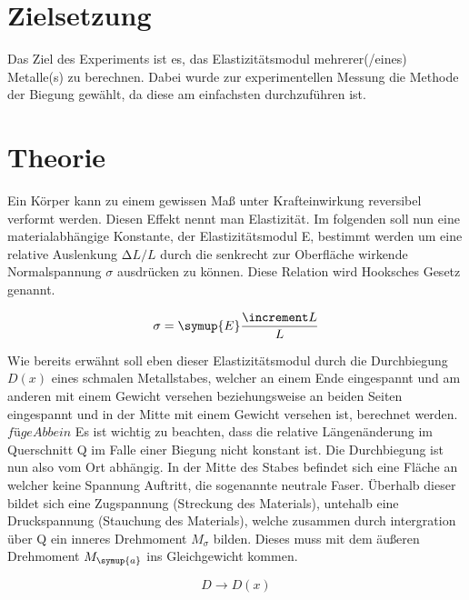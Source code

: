 \section{Zielsetzung}
\label{sec:Zielsetzung}

Das Ziel des Experiments ist es, das Elastizitätsmodul mehrerer(/eines) Metalle(s) zu berechnen.
Dabei wurde zur experimentellen Messung die Methode der Biegung gewählt, da diese am einfachsten durchzuführen ist.

\section{Theorie}
\label{sec:Theorie}

Ein Körper kann zu einem gewissen Maß unter Krafteinwirkung reversibel
verformt werden. Diesen Effekt nennt man Elastizität. Im folgenden soll nun
eine materialabhängige Konstante, der Elastizitätsmodul E, bestimmt werden
um eine relative Auslenkung $\increment L/L$ durch die senkrecht zur Oberfläche
wirkende Normalspannung $\sigma$ ausdrücken zu können. Diese Relation wird
Hooksches Gesetz genannt.

\begin{equation}
  \sigma = \symup{E}\frac{\increment L}{L}
\end{equation}

Wie bereits erwähnt soll eben dieser Elastizitätsmodul durch die
Durchbiegung $D(x)$ eines schmalen Metallstabes, welcher an
einem Ende eingespannt und am anderen mit einem Gewicht versehen
beziehungsweise an beiden Seiten eingespannt und in der Mitte
mit einem Gewicht versehen ist, berechnet werden.
$füge Abb ein$
Es ist wichtig zu beachten, dass die relative Längenänderung im Querschnitt
Q im Falle einer Biegung nicht konstant ist. Die Durchbiegung ist nun also
vom Ort abhängig. In der Mitte des Stabes befindet sich eine Fläche an welcher
keine Spannung Auftritt, die sogenannte neutrale Faser. Überhalb dieser
bildet sich eine Zugspannung (Streckung des Materials), untehalb eine Druckspannung
(Stauchung des Materials), welche zusammen durch intergration über Q ein inneres Drehmoment $M_\sigma$ bilden.
Dieses muss mit dem äußeren Drehmoment $M_\symup{a}$ ins Gleichgewicht kommen.

\begin{equation}
  D \to D(x)
\end{equation}




\cite{litval}
